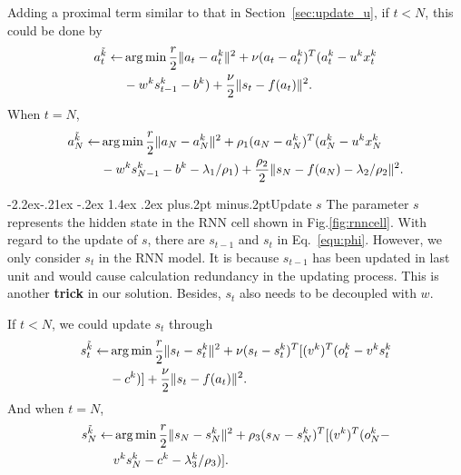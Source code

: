 \documentclass[twoside]{article}
\makeatletter
\def\subsubsection{\@startsection{subsubsection}{3}{\z@}%
 {-2.2ex\@plus -.21ex \@minus -.2ex}%
 {1.4ex \@plus.2ex}
{\normalfont\normalsize\protect\baselineskip=12pt plus.2pt minus.2pt\sl}}
\makeatother
\begin{document}
\begin{multicols}{2}
Adding a proximal term similar to that in Section~\ref{sec:update_u}, if $t<N$, this could be done by
\begin{equation}\label{equ:update_at}
    \begin{aligned}
        a_t^{\Tilde{k}} \leftarrow & \arg\min \frac{r}{2}\|a_t-a_t^k\|^2+\nu (a_t-a_t^k)^T(a_t^k-u^kx_t^k \\
        & -w^ks_{t-1}^k-b^k)+\frac{\nu}{2}\|s_t-f(a_t)\|^2.
    \end{aligned}
\end{equation}
When $t=N$, 
\begin{equation}\label{equ:update_aN}
    \begin{aligned}
        a_N^{\Tilde{k}} \leftarrow & \arg\min \frac{r}{2}\|a_N-a_N^k\|^2+\rho_{1} (a_N-a_N^k)^T(a_N^k-u^kx_N^k  \\
        & -w^ks_{N-1}^k-b^k-\lambda_1/\rho_1)+\frac{\rho_{2}}{2}\|s_N-f(a_N)-\lambda_2/\rho_2\|^2. \\
    \end{aligned}
\end{equation}

\subsubsection{Update $s$}
The parameter $s$ represents the hidden state in the RNN cell shown in Fig.\ref{fig:rnncell}.
With regard to the update of $s$, there are $s_{t-1}$ and $s_t$ in Eq.~\eqref{equ:phi}.
However, we only consider $s_t$ in the RNN model. 
It is because $s_{t-1}$ has been updated in last unit and would cause calculation redundancy in the updating process. This is another \textbf{trick} in our solution. 
Besides, $s_t$ also needs to be decoupled with $w$. 

If $t<N$, we could update $s_t$ through
\begin{equation}\label{equ:update_st}
    \begin{aligned}
        s_t^{\Tilde{k}} \leftarrow & \arg\min \frac{r}{2}\|s_t-s_t^k\|^2+\nu(s_t-s_t^k)^T[(v^k)^T(o_t^k-v^ks_t^k\\
        & -c^k)]+\frac{\nu}{2}\|s_t-f(a_t)\|^2.   \\
    \end{aligned}    
\end{equation}
And when $t=N$, 
\begin{equation}\label{equ:update_sN}
    \begin{aligned}
        s_N^{\Tilde{k}} \leftarrow & \arg\min \frac{r}{2}\|s_N-s_N^k\|^2+\rho_3(s_N-s_N^k)^T[(v^k)^T(o_N^k-\\
        & v^ks_N^k-c^k-\lambda_3^k/\rho_3)].   \\
    \end{aligned}    
\end{equation}



\end{multicols}
\end{document}
